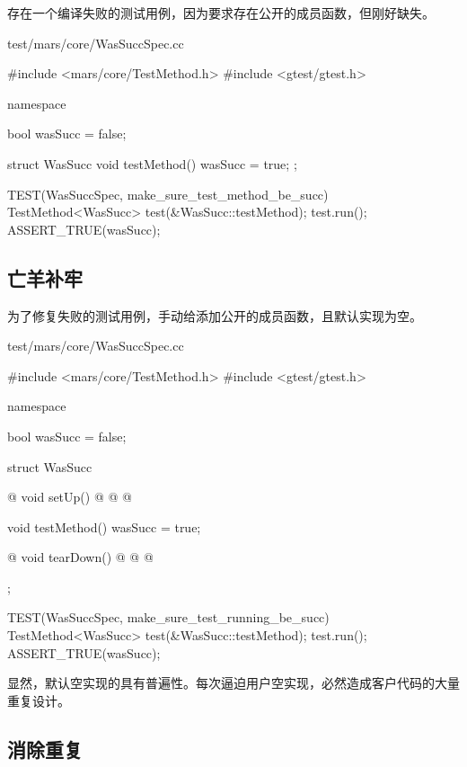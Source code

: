 \begin{content}

存在一个编译失败的测试用例，因为要求存在公开的成员函数，但刚好缺失。

\begin{nodiff}{test/mars/core/WasSuccSpec.cc}
\begin{c++}
#include <mars/core/TestMethod.h>
#include <gtest/gtest.h>

namespace {
  bool wasSucc = false;

  struct WasSucc {
    void testMethod() {
      wasSucc = true;
    }
  };
}

TEST(WasSuccSpec, make_sure_test_method_be_succ) {
  TestMethod<WasSucc> test(&WasSucc::testMethod);
  test.run();
  ASSERT_TRUE(wasSucc);
}
\end{c++}
\end{nodiff}

\subsection{亡羊补牢}

为了修复失败的测试用例，手动给添加公开的成员函数，且默认实现为空。

\begin{nodiff}{test/mars/core/WasSuccSpec.cc}
\begin{c++}
#include <mars/core/TestMethod.h>
#include <gtest/gtest.h>

namespace {
  bool wasSucc = false;

  struct WasSucc {
@    void setUp() {@
@    }@

    void testMethod() {
      wasSucc = true;
    }

@    void tearDown() {@
@    }@
  };
}

TEST(WasSuccSpec, make_sure_test_running_be_succ) {
  TestMethod<WasSucc> test(&WasSucc::testMethod);
  test.run();
  ASSERT_TRUE(wasSucc);
}
\end{c++}
\end{nodiff}

显然，默认空实现的具有普遍性。每次逼迫用户空实现，必然造成客户代码的大量重复设计。

\subsection{消除重复}


\end{content}
